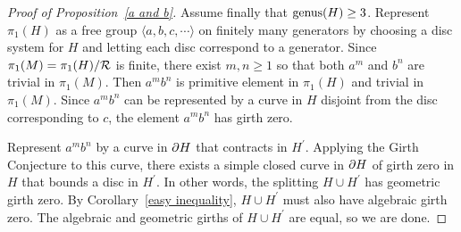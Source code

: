 \begin{proof}[Proof of Proposition~\ref{a and b}]
Assume finally that $\operatorname{genus}(H)\geq 3$.  Represent $\pi_1(H)$ as a free 
group $\langle a, b, c, \cdots\rangle$ on finitely many generators
by choosing a disc system for $H$ and letting each disc correspond to
a generator.  Since $\pi_1(M)=\pi_1(H)/\mathcal{R}$ is finite, there exist 
$m,n\geq 1$ so that both $a^m$ and $b^n$ are trivial in $\pi_1(M)$.  
Then $a^mb^n$ is primitive element in $\pi_1(H)$ and trivial in $\pi_{1}(M)$.  Since $a^mb^n$ can be represented by a curve in $H$ disjoint from 
the disc corresponding to $c$, the element $a^m b^n$ has girth zero.

Represent $a^mb^n$ by a curve in $\partial H$ that contracts in $H^\prime$.  Applying the Girth Conjecture to this curve, there exists a simple closed curve in $\partial H$ of girth zero in $H$ that bounds a disc in $H^\prime$.  In other words, the splitting $H\cup H^\prime$ has geometric girth zero.  By Corollary~\ref{easy inequality}, $H\cup H^\prime$ must also have algebraic girth zero.  The algebraic and geometric girths of $H\cup H^{\prime}$ are equal, so we are done.
\end{proof}